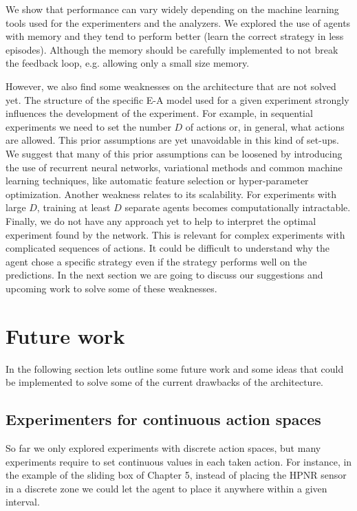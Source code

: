 \documentclass[11pt,a4paper,twoside]{report}
\newcommand{\+}{\textnormal{+} }
\theoremstyle{definition}
\numberwithin{equation}{chapter}
\begin{document}
We show that performance can vary widely depending on the machine learning tools
used for the experimenters and the analyzers. We explored the use of agents with
memory and they tend to perform better (learn the correct strategy in less
episodes). Although the memory should be carefully implemented to not break the
feedback loop, e.g. allowing only a small size memory.

However, we also find some weaknesses on the architecture that are not solved yet.
The structure of the specific E-A model used for a given experiment strongly
influences the development of the experiment. For example, in sequential
experiments we need to set the number $D$ of actions or, in general, what actions
are allowed. This prior assumptions are yet unavoidable in this kind of set-ups.
We suggest that many of this prior assumptions can be loosened by
introducing the use of recurrent neural networks, variational methods and
common machine learning techniques, like automatic feature selection or
hyper-parameter optimization. Another weakness relates to its scalability. For
experiments with large $D$, training at least $D$ separate agents becomes 
computationally intractable. Finally, we do not have any approach yet to help to
interpret the optimal experiment found by the network. This is relevant
for complex experiments with complicated sequences of actions. It could be
difficult to understand why the agent chose a specific strategy even if 
the strategy performs well on the predictions. In the next section we are going
to discuss our suggestions and upcoming work to solve some of these weaknesses.

\section{Future work}

In the following section lets outline some future work and some ideas that could
be implemented to solve some of the current drawbacks of the architecture.
\subsection{Experimenters for continuous action spaces}
So far we only explored experiments with discrete action spaces, but many
experiments require to set continuous values in each taken action.
For instance, in the example of the sliding box of Chapter 5, instead of placing 
the HPNR sensor in a discrete zone we could let the agent to place it anywhere
within a given interval. 
\end{document}

